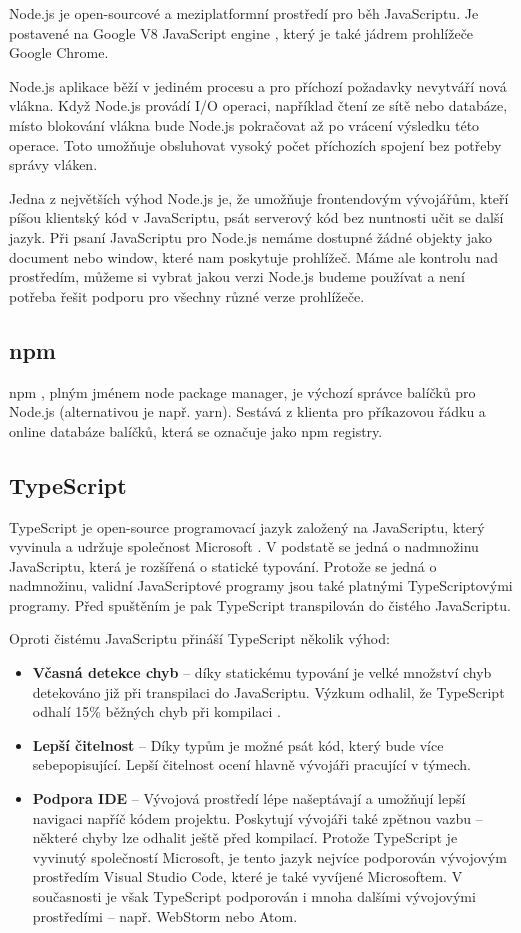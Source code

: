 \documentclass[thesis=M,czech]{FITthesis}[2019/12/23]
\begin{document}
Node.js \cite{node} je open-sourcové a meziplatformní prostředí pro běh JavaScriptu. Je postavené na Google V8 JavaScript engine \cite{v8}, který je také jádrem prohlížeče Google Chrome.

Node.js aplikace běží v jediném procesu a pro příchozí požadavky nevytváří nová vlákna. Když Node.js provádí I/O operaci, například čtení ze sítě nebo databáze, místo blokování vlákna bude Node.js pokračovat až po vrácení výsledku této operace. Toto umožňuje obsluhovat vysoký počet příchozích spojení bez potřeby správy vláken.

Jedna z největších výhod Node.js je, že umožňuje frontendovým vývojářům, kteří píšou klientský kód v JavaScriptu, psát serverový kód bez nuntnosti učit se další jazyk. 
Při psaní JavaScriptu pro Node.js nemáme dostupné žádné objekty jako document nebo window, které nam poskytuje prohlížeč. Máme ale kontrolu nad prostředím, můžeme si vybrat jakou verzi Node.js budeme používat a není potřeba řešit podporu pro všechny různé verze prohlížeče.

\subsection{npm}
npm \cite{npm}, plným jménem node package manager, je výchozí správce balíčků pro Node.js (alternativou je např. yarn\cite{yarn}). Sestává z klienta pro příkazovou řádku a online databáze balíčků, která se označuje jako npm registry.

\subsection{TypeScript}
TypeScript je open-source programovací jazyk založený na JavaScriptu, který vyvinula a udržuje společnost Microsoft \cite{typescript}. V podstatě se jedná o nadmnožinu JavaScriptu, která je rozšířená o statické typování. Protože se jedná o nadmnožinu, validní JavaScriptové programy jsou také platnými TypeScriptovými programy. Před spuštěním je pak TypeScript transpilován do čistého JavaScriptu.

Oproti čistému JavaScriptu přináší TypeScript několik výhod:

\begin{itemize}
  \item \textbf{Včasná detekce chyb} -- díky statickému typování je velké množství chyb detekováno již při transpilaci do JavaScriptu. Výzkum odhalil, že TypeScript odhalí 15\% běžných chyb při kompilaci \cite{typescript_bugs}.
  \item \textbf{Lepší čitelnost} -- Díky typům je možné psát kód, který bude více sebepopisující. Lepší čitelnost ocení hlavně vývojáři pracující v týmech.
  \item \textbf{Podpora IDE} -- Vývojová prostředí lépe našeptávají a umožňují lepší navigaci napříč kódem projektu. Poskytují vývojáři také zpětnou vazbu -- některé chyby lze odhalit ještě před kompilací. Protože TypeScript je vyvinutý společností Microsoft, je tento jazyk nejvíce podporován vývojovým prostředím Visual Studio Code, které je také vyvíjené Microsoftem. V současnosti je však TypeScript podporován i mnoha dalšími vývojovými prostředími -- např. WebStorm nebo Atom.
\end{itemize}
\end{document}
